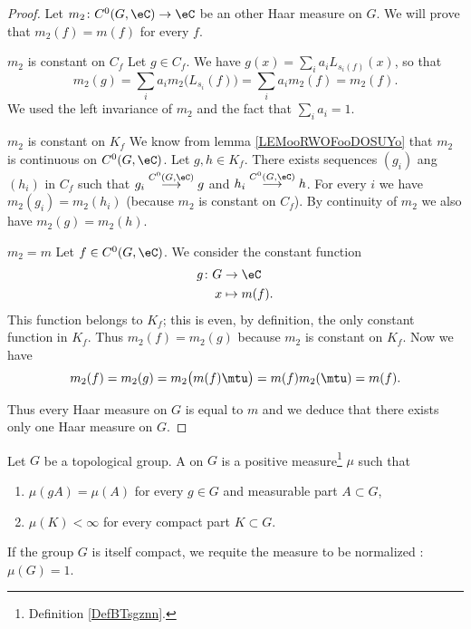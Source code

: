 \begin{proof}
    Let \( m_2\colon C^0(G,\eC)\to \eC\) be an other Haar measure on \( G\). We will prove that \( m_2(f)=m(f)\) for every \( f\). 
    \begin{subproof}
    \item[\( m_2\) is constant on \( C_f\)]
        Let \( g\in C_f\). We have \( g(x)=\sum_ia_iL_{s_i(f)}(x)\), so that
        \begin{equation}
            m_2(g)=\sum_ia_im_2\big(L_{s_i}(f)\big)=\sum_ia_im_2(f)=m_2(f).
        \end{equation}
        We used the left invariance of \( m_2\) and the fact that \( \sum_ia_i=1\).
    \item[\( m_2\) is constant on \( K_f\)]
        We know from lemma \ref{LEMooRWOFooDOSUYo} that \( m_2\) is continuous on \( C^0(G,\eC)\). Let \( g,h\in K_f\). There exists sequences \( (g_i)\) ang \( (h_i)\) in \( C_f\) such that \( g_i\stackrel{C^0(G,\eC)}{\longrightarrow}g\) and \( h_i\stackrel{C^0(G,\eC)}{\longrightarrow} h\). For every \( i\) we have \( m_2(g_i)=m_2(h_i)\) (because \( m_2\) is constant on \( C_f\)). By continuity of \( m_2\) we also have \( m_2(g)=m_2(h)\).
    \item[\( m_2=m\)]
        Let \( f\in C^0(G,\eC)\). We consider the constant function 
        \begin{equation}
            \begin{aligned}
                g\colon G&\to \eC \\
                x&\mapsto m(f). 
            \end{aligned}
        \end{equation}
        This function belongs to \( K_f\); this is even, by definition, the only constant function in \( K_f\). Thus \( m_2(f)=m_2(g)\) because \( m_2\) is constant on \( K_f\). Now we have
        \begin{equation}
            m_2(f)=m_2(g)=m_2\big( m(f)\mtu \big)=m(f)m_2(\mtu)=m(f).
        \end{equation}
    \end{subproof}
    Thus every Haar measure on \( G\) is equal to \( m\) and we deduce that there exists only one Haar measure on \( G\).
\end{proof}

\begin{definition}      \label{DEFooXIKEooWOxHlr}
    Let \( G\) be a topological group. A  on \( G\) is a positive measure\footnote{Definition \ref{DefBTsgznn}.} \( \mu\) such that
	\begin{enumerate}
		\item
		      \( \mu(gA)=\mu(A)\) for every \( g\in G\) and measurable part \( A\subset G\),
		\item
		      \( \mu(K)<\infty\) for every compact part \( K\subset G\).
	\end{enumerate}
    If the group \( G\) is itself compact, we requite the measure to be normalized : \( \mu(G)=1\).
\end{definition}



